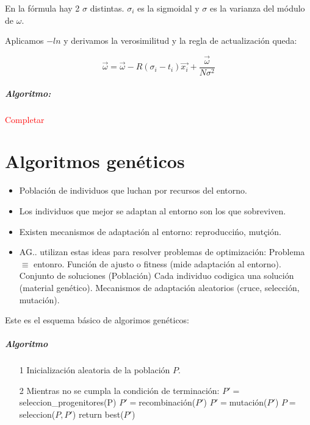 \documentclass{apuntes}
\begin{document}
\obs En la fórmula hay 2 $σ$ distintas. $σ_i$ es la sigmoidal y $σ$ es la varianza del módulo de $ω$.



Aplicamos $-ln$ y derivamos la verosimilitud y la regla de actualización queda:

\[
\vec{ω} = \vec{ω} - R\left(σ_i - t_i\right)\vec{x_i} + \frac{\vec{ω}}{Nσ^2}
\]

\paragraph{Algoritmo:}

\textcolor{red}{Completar}

\chapter{Algoritmos genéticos}

\begin{itemize}
	\item 
Población de individuos que luchan por recursos del entorno.
\item Los individuos que mejor se adaptan al entorno son los que sobreviven.
\item Existen mecanismos de adaptación al entorno: reproduccińo, mutçión.
\item AG.. utilizan estas ideas para resolver problemas de optimización:
\subitem Problema $\equiv$ entonro.
\subitem Función de ajusto o fitness (mide adaptación al entorno).
\subitem Conjunto de soluciones (Población)
\subitem Cada individuo codigica una solución (material genético).
\subitem Mecanismos de adaptación aleatorios (cruce, selección, mutación).
\end{itemize}

Este es el esquema básico de algorimos genéticos:

\paragraph{Algoritmo}
\begin{itemize}
	\item[1] Inicialización aleatoria de la población $P$.
	\item[2] Mientras no se cumpla la condición de terminación:
	\subitem $P'=$seleccion\_progenitores(P)
	\subitem $P'=$recombinación($P'$)
	\subitem $P'=$mutación($P'$)
	\subitem $P=$seleccion($P,P'$)
	return best($P'$)
\end{itemize}
\end{document}
